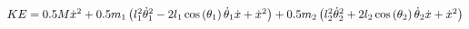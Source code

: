 \documentclass[preview]{standalone}
\begin{document}
\centering $KE =\\ 0.5 M \dot{x}^{2} + 0.5 m_{1} \left(l_{1}^{2} \dot{\theta}_{1}^{2} - 2 l_{1} \operatorname{cos}\left(\theta_{1}\right) \dot{\theta}_{1} \dot{x} + \dot{x}^{2}\right) + 0.5 m_{2} \left(l_{2}^{2} \dot{\theta}_{2}^{2} + 2 l_{2} \operatorname{cos}\left(\theta_{2}\right) \dot{\theta}_{2} \dot{x} + \dot{x}^{2}\right)$
\end{document}
